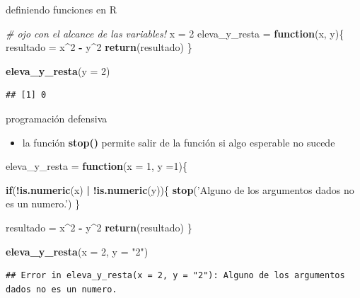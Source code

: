 \documentclass[ignorenonframetext,]{beamer}
\newenvironment{Shaded}{\begin{snugshade}}{\end{snugshade}}
\newcommand{\CommentTok}[1]{\textcolor[rgb]{0.56,0.35,0.01}{\textit{#1}}}
\newcommand{\ControlFlowTok}[1]{\textcolor[rgb]{0.13,0.29,0.53}{\textbf{#1}}}
\newcommand{\DataTypeTok}[1]{\textcolor[rgb]{0.13,0.29,0.53}{#1}}
\newcommand{\DecValTok}[1]{\textcolor[rgb]{0.00,0.00,0.81}{#1}}
\newcommand{\KeywordTok}[1]{\textcolor[rgb]{0.13,0.29,0.53}{\textbf{#1}}}
\newcommand{\NormalTok}[1]{#1}
\newcommand{\OperatorTok}[1]{\textcolor[rgb]{0.81,0.36,0.00}{\textbf{#1}}}
\newcommand{\StringTok}[1]{\textcolor[rgb]{0.31,0.60,0.02}{#1}}
\providecommand{\tightlist}{%
  \setlength{\itemsep}{0pt}\setlength{\parskip}{0pt}}
\begin{document}
\begin{frame}[fragile]{definiendo funciones en R}
\protect\hypertarget{definiendo-funciones-en-r-6}{}

\begin{Shaded}
\begin{Highlighting}[]
\CommentTok{# ojo con el alcance de las variables!}
\NormalTok{x =}\StringTok{ }\DecValTok{2}
\NormalTok{eleva_y_resta =}\StringTok{ }\ControlFlowTok{function}\NormalTok{(x, y)\{}
\NormalTok{  resultado =}\StringTok{ }\NormalTok{x}\OperatorTok{^}\DecValTok{2} \OperatorTok{-}\StringTok{ }\NormalTok{y}\OperatorTok{^}\DecValTok{2}
  \KeywordTok{return}\NormalTok{(resultado)}
\NormalTok{\}}

\KeywordTok{eleva_y_resta}\NormalTok{(}\DataTypeTok{y =} \DecValTok{2}\NormalTok{)}
\end{Highlighting}
\end{Shaded}

\begin{verbatim}
## [1] 0
\end{verbatim}

\end{frame}

\begin{frame}[fragile]{programación defensiva}
\protect\hypertarget{programaciuxf3n-defensiva}{}

\begin{itemize}
\tightlist
\item
  la función \textbf{stop()} permite salir de la función si algo
  esperable no sucede
\end{itemize}

\begin{Shaded}
\begin{Highlighting}[]
\NormalTok{eleva_y_resta =}\StringTok{ }\ControlFlowTok{function}\NormalTok{(}\DataTypeTok{x =} \DecValTok{1}\NormalTok{, }\DataTypeTok{y =}\DecValTok{1}\NormalTok{)\{}
  
  \ControlFlowTok{if}\NormalTok{(}\OperatorTok{!}\KeywordTok{is.numeric}\NormalTok{(x) }\OperatorTok{|}\StringTok{ }\OperatorTok{!}\KeywordTok{is.numeric}\NormalTok{(y))\{}
    \KeywordTok{stop}\NormalTok{(}\StringTok{'Alguno de los argumentos dados no es un numero.'}\NormalTok{)}
\NormalTok{  \}}
  
\NormalTok{  resultado =}\StringTok{ }\NormalTok{x}\OperatorTok{^}\DecValTok{2} \OperatorTok{-}\StringTok{ }\NormalTok{y}\OperatorTok{^}\DecValTok{2}
  \KeywordTok{return}\NormalTok{(resultado)}
\NormalTok{\}}

\KeywordTok{eleva_y_resta}\NormalTok{(}\DataTypeTok{x =} \DecValTok{2}\NormalTok{, }\DataTypeTok{y =} \StringTok{"2"}\NormalTok{)}
\end{Highlighting}
\end{Shaded}

\begin{verbatim}
## Error in eleva_y_resta(x = 2, y = "2"): Alguno de los argumentos dados no es un numero.
\end{verbatim}

\end{frame}
\end{document}
